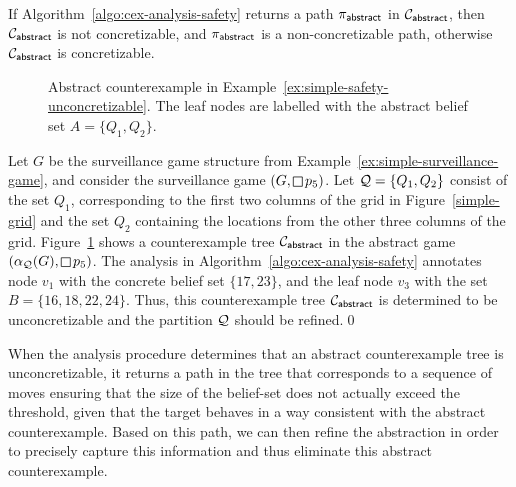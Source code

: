 \begin{theorem}
If Algorithm~\ref{algo:cex-analysis-safety} returns a path $\pi_{\mathsf{abstract}}$ in $\mathcal{C}_{\mathsf{abstract}}$, then $\mathcal{C}_{\mathsf{abstract}}$ is not concretizable, and $\pi_{\mathsf{abstract}}$ is a non-concretizable path, otherwise  $\mathcal{C}_{\mathsf{abstract}}$ is concretizable.
\end{theorem}

\begin{figure}
\begin{center}

\end{center}
\vspace{-.2cm}
\caption{Abstract counterexample in Example~\ref{ex:simple-safety-unconcretizable}. The leaf nodes are labelled with the abstract belief set $A = \{Q_1,Q_2\}$.}
\label{fig:simple-safety-counterex-1}
\vspace{-.5cm}
\end{figure}

\begin{example}\label{ex:simple-safety-unconcretizable}
Let $G$ be the surveillance game structure from Example~\ref{ex:simple-surveillance-game}, and consider the surveillance game $(G,\LTLglobally p_5)$. 
Let $\mathcal{Q} = \{Q_1,Q_2\}$ consist of the set $Q_1$, corresponding to the first two columns of the grid in Figure~\ref{simple-grid} and the set $Q_2$ containing the locations from the other three columns of the grid. Figure~\ref{fig:simple-safety-counterex-1} shows a counterexample tree $\mathcal{C}_{\mathsf{abstract}}$ in the abstract game $(\alpha_\part(G),\LTLglobally p_5)$. The analysis in Algorithm~\ref{algo:cex-analysis-safety} annotates node $v_1$ with the concrete belief set $\{17,23\}$, and the leaf node $v_3$ with the set $B = \{16,18,22,24\}$. Thus, this counterexample tree $\mathcal{C}_{\mathsf{abstract}}$ is determined to be unconcretizable and the partition $\mathcal{Q}$ should be refined.\qed
\end{example}

When the analysis procedure determines that an abstract counterexample tree is unconcretizable, it returns a path in the tree that corresponds to a sequence of moves ensuring that the size of the belief-set does not actually exceed the threshold, given that the target behaves in a way consistent with the abstract counterexample.  Based on this path, we can then refine the abstraction in order to precisely capture this information and thus eliminate this abstract counterexample.


